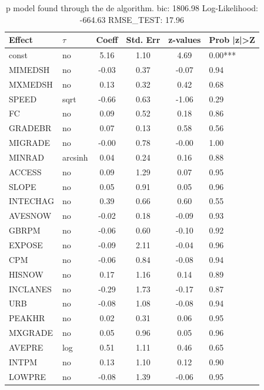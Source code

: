 \begin{table}
	\caption{p model found through the de algorithm. bic: 1806.98 Log-Likelihood: -664.63 RMSE_TEST: 17.96}
	\begin{center}
		\begin{tabular}{|l|l|c|c|c|l|}
			\hline
			Effect & $\tau$ & Coeff & Std. Err & z-values & Prob |z|>Z \\
			\hline
			const & no & 5.16 & 1.10 & 4.69 & 0.00*** \\
			\hline
			MIMEDSH & no & -0.03 & 0.37 & -0.07 & 0.94 \\
			\hline
			MXMEDSH & no & 0.13 & 0.32 & 0.42 & 0.68 \\
			\hline
			SPEED & sqrt & -0.66 & 0.63 & -1.06 & 0.29 \\
			\hline
			FC & no & 0.09 & 0.52 & 0.18 & 0.86 \\
			\hline
			GRADEBR & no & 0.07 & 0.13 & 0.58 & 0.56 \\
			\hline
			MIGRADE & no & -0.00 & 0.78 & -0.00 & 1.00 \\
			\hline
			MINRAD & arcsinh & 0.04 & 0.24 & 0.16 & 0.88 \\
			\hline
			ACCESS & no & 0.09 & 1.29 & 0.07 & 0.95 \\
			\hline
			SLOPE & no & 0.05 & 0.91 & 0.05 & 0.96 \\
			\hline
			INTECHAG & no & 0.39 & 0.66 & 0.60 & 0.55 \\
			\hline
			AVESNOW & no & -0.02 & 0.18 & -0.09 & 0.93 \\
			\hline
			GBRPM & no & -0.06 & 0.60 & -0.10 & 0.92 \\
			\hline
			EXPOSE & no & -0.09 & 2.11 & -0.04 & 0.96 \\
			\hline
			CPM & no & -0.06 & 0.84 & -0.08 & 0.94 \\
			\hline
			HISNOW & no & 0.17 & 1.16 & 0.14 & 0.89 \\
			\hline
			INCLANES & no & -0.29 & 1.73 & -0.17 & 0.87 \\
			\hline
			URB & no & -0.08 & 1.08 & -0.08 & 0.94 \\
			\hline
			PEAKHR & no & 0.02 & 0.31 & 0.06 & 0.95 \\
			\hline
			MXGRADE & no & 0.05 & 0.96 & 0.05 & 0.96 \\
			\hline
			AVEPRE & log & 0.51 & 1.11 & 0.46 & 0.65 \\
			\hline
			INTPM & no & 0.13 & 1.10 & 0.12 & 0.90 \\
			\hline
			LOWPRE & no & -0.08 & 1.39 & -0.06 & 0.95 \\

\end{tabular}
\end{center}
\end{table}
